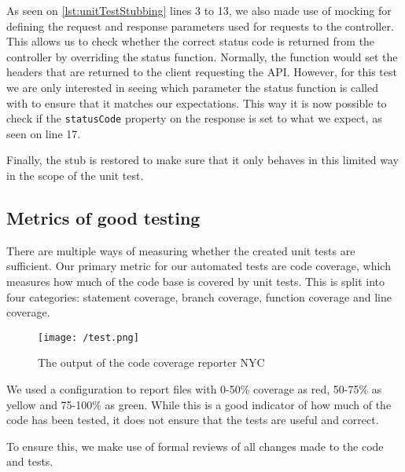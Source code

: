 As seen on \autoref{lst:unitTestStubbing} lines 3 to 13, we also made use of mocking for defining the request and response parameters used for requests to the controller.
This allows us to check whether the correct status code is returned from the controller by overriding the status function.
Normally, the function would set the headers that are returned to the client requesting the API.
However, for this test we are only interested in seeing which parameter the status function is called with to ensure that it matches our expectations.
This way it is now possible to check if the \texttt{statusCode} property on the response is set to what we expect, as seen on line 17.

Finally, the stub is restored to make sure that it only behaves in this limited way in the scope of the unit test.

\subsection{Metrics of good testing}
There are multiple ways of measuring whether the created unit tests are sufficient.
Our primary metric for our automated tests are code coverage, which measures how much of the code base is covered by unit tests.
This is split into four categories: statement coverage, branch coverage, function coverage and line coverage.

\begin{figure}[H]
    \texttt{[image: /test.png]}
     \caption{The output of the code coverage reporter NYC}
     \label{fig:testResults}
 \end{figure}

We used a configuration to report files with 0-50\% coverage as red, 50-75\% as yellow and 75-100\% as green.
While this is a good indicator of how much of the code has been tested, it does not ensure that the tests are useful and correct.

To ensure this, we make use of formal reviews of all changes made to the code and tests.
